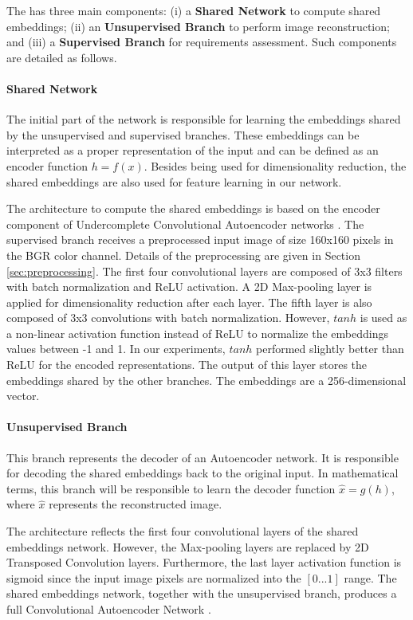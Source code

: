 The \methodname has three main components: (i) a \textbf{Shared Network} to compute shared embeddings; (ii) an \textbf{Unsupervised Branch} to perform image reconstruction; and (iii) a \textbf{Supervised Branch} for requirements assessment. Such components are detailed as follows.

\paragraph{Shared Network}

The initial part of the network is responsible for learning the embeddings shared by the unsupervised and supervised branches. These embeddings can be interpreted as a proper representation of the input and can be defined as an encoder function $h = f(x)$. Besides being used for dimensionality reduction, the shared embeddings are also used for feature learning in our network.

The architecture to compute the shared embeddings is based on the encoder component of Undercomplete Convolutional Autoencoder networks \citep[p.~500]{goodfellow2016deep}. The supervised branch receives a preprocessed input image of size 160x160 pixels in the BGR color channel. Details of the preprocessing are given in Section \ref{sec:preprocessing}. The first four convolutional layers are composed of 3x3 filters with batch normalization and ReLU activation. A 2D Max-pooling layer is applied for dimensionality reduction after each layer. The fifth layer is also composed of 3x3 convolutions with batch normalization. However, $tanh$ is used as a non-linear activation function instead of ReLU to normalize the embeddings values between -1 and 1. In our experiments, $tanh$ performed slightly better than ReLU for the encoded representations. The output of this layer stores the embeddings shared by the other branches. The embeddings are a 256-dimensional vector.

\paragraph{Unsupervised Branch}

This branch represents the decoder of an Autoencoder network. It is responsible for decoding the shared embeddings back to the original input. In mathematical terms, this branch will be responsible to learn the decoder function $\hat{x} = g(h)$, where $\hat{x}$ represents the reconstructed image. 

The architecture reflects the first four convolutional layers of the shared embeddings network. However, the Max-pooling layers are replaced by 2D Transposed Convolution layers. Furthermore, the last layer activation function is sigmoid since the input image pixels are normalized into the $[0...1]$ range. The shared embeddings network, together with the unsupervised branch, produces a full Convolutional Autoencoder Network \citep{goodfellow2016deep}.


